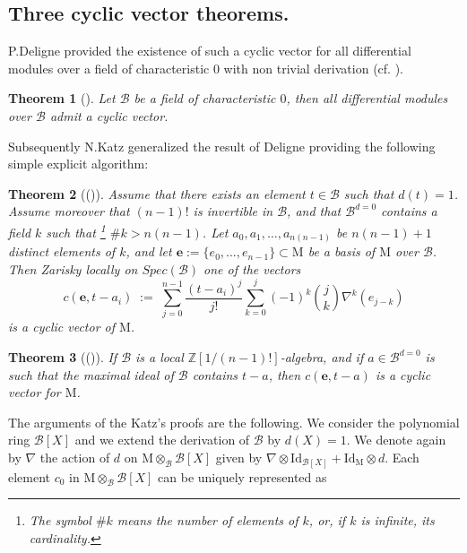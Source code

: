 \documentclass{compositio}
\newtheorem{theorem}{Theorem}[section]
\numberwithin{equation}{section}
\begin{document}
\subsection{Three cyclic vector theorems.}  P.Deligne provided the existence of such a cyclic vector 
for all differential modules over a field of characteristic $0$ with non trivial derivation 
(cf. \cite[Ch.II,Lemme 1.3]{Deligne-Reg-Sing}). 
\begin{theorem}[]\label{deligne}
Let ${\mathscr{B}}$ be a field of characteristic $0$, then all differential modules over ${\mathscr{B}}$ admit a cyclic vector.
\end{theorem}
Subsequently N.Katz generalized the result of Deligne 
providing the following simple explicit algorithm:
\begin{theorem}[(\cite{Katz-cyclic})]\label{theorem 1 of Katz}
Assume that there exists an element $t\in {\mathscr{B}}$ such that $d(t)=1$. 
Assume moreover that $(n-1)!$ is invertible in ${\mathscr{B}}$, and that ${\mathscr{B}}^{d=0}$ contains a field $k$ such that
\footnote{The symbol $\#k$ means the number of elements of $k$, or, if $k$ is infinite, its cardinality.} $\#k>n(n-1)$.
Let $a_0,a_1,\ldots,a_{n(n-1)}$ be $n(n-1)+1$ distinct elements of $k$, and let ${\mathbf{e}}:=\{e_0,\ldots,e_{n-1}\}\subset{\mathrm{M}}$ 
be a basis of ${\mathrm{M}}$ over ${\mathscr{B}}$. Then Zarisky locally on $Spec({\mathscr{B}})$ one of the vectors 
\begin{equation}\label{cyclic vector}
c({\mathbf{e}},t-a_i)\;:=\;\sum_{j=0}^{n-1}\frac{(t-a_i)^j}{j!}\sum_{k=0}^j(-1)^k\binom{j}{k}\nabla^k(e_{j-k})
\end{equation}
is a cyclic vector of ${\mathrm{M}}$.
\end{theorem}
\begin{theorem}[(\cite{Katz-cyclic})]\label{theorem 2 of Katz}
If ${\mathscr{B}}$ is a local $\mathbb{Z}[1/(n-1)!]$-algebra, and if $a\in{\mathscr{B}}^{d=0}$ is such that the maximal ideal of ${\mathscr{B}}$
contains $t-a$, then $c({\mathbf{e}},t-a)$ is a cyclic vector for ${\mathrm{M}}$. 
\end{theorem}
The arguments of the Katz's proofs are the following. 
We consider the polynomial ring ${\mathscr{B}}[X]$ and we extend the derivation of ${\mathscr{B}}$ by $d(X)=1$. 
We denote again by $\nabla$ the action of $d$ on ${\mathrm{M}}\otimes_{\mathscr{B}}{\mathscr{B}}[X]$ given by 
$\nabla\otimes\mathrm{Id}_{{\mathscr{B}}[X]}+\mathrm{Id}_{\mathrm{M}}\otimes d$.
Each element $c_0$ in ${\mathrm{M}}\otimes_{\mathscr{B}}{\mathscr{B}}[X]$ can be uniquely represented as 
\end{document}
